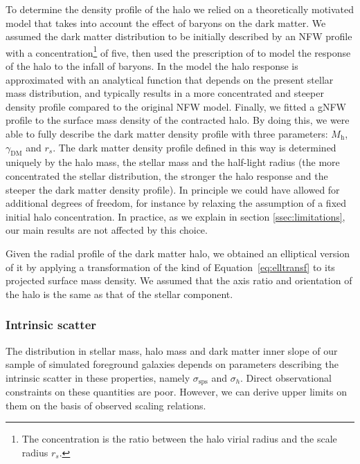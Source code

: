 \documentclass{aa}
\def\gammadm{\gamma_{\mathrm{DM}}}
\def\mhalo{M_{\mathrm{h}}}
\def\Eref#1{Equation~\ref{#1}\xspace}
\begin{document}
To determine the density profile of the halo we relied on a theoretically motivated model that takes into account the effect of baryons on the dark matter.
We assumed the dark matter distribution to be initially described by an NFW profile with a concentration\footnote{The concentration is the ratio between the halo virial radius and the scale radius $r_s$.} of five, then used the prescription of \citet{Cau++20} to model the response of the halo to the infall of baryons. 
In the \citet{Cau++20} model the halo response is approximated with an analytical function that depends on the present stellar mass distribution, and typically results in a more concentrated and steeper density profile compared to the original NFW model. 
Finally, we fitted a gNFW profile to the surface mass density of the contracted halo. By doing this, we were able to fully describe the dark matter density profile with three parameters: $\mhalo$, $\gammadm$ and $r_s$.
%
The dark matter density profile defined in this way is determined uniquely by the halo mass, the stellar mass and the half-light radius (the more concentrated the stellar distribution, the stronger the halo response and the steeper the dark matter density profile).
In principle we could have allowed for additional degrees of freedom, for instance by relaxing the assumption of a fixed initial halo concentration.
In practice, as we explain in section \ref{ssec:limitations}, our main results are not affected by this choice.

Given the radial profile of the dark matter halo, we obtained an elliptical version of it by applying a transformation of the kind of \Eref{eq:elltransf} to its projected surface mass density.
We assumed that the axis ratio and orientation of the halo is the same as that of the stellar component.

\subsubsection{Intrinsic scatter}\label{ssub:scat}

The distribution in stellar mass, halo mass and dark matter inner slope of our sample of simulated foreground galaxies depends on parameters describing the intrinsic scatter in these properties, namely $\sigma_{\mathrm{sps}}$ and $\sigma_h$.
Direct observational constraints on these quantities are poor.
However, we can derive upper limits on them on the basis of observed scaling relations.
\end{document}
